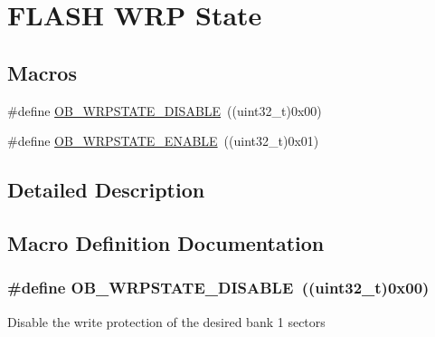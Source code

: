 \hypertarget{group___f_l_a_s_h_ex___w_r_p___state}{}\section{F\+L\+A\+SH W\+RP State}
\label{group___f_l_a_s_h_ex___w_r_p___state}
\subsection*{Macros}
\begin{DoxyCompactItemize}
\item 
\#define \hyperlink{group___f_l_a_s_h_ex___w_r_p___state_gaa34eb6205fe554f65a311ee974d5a4ab}{O\+B\+\_\+\+W\+R\+P\+S\+T\+A\+T\+E\+\_\+\+D\+I\+S\+A\+B\+LE}~((uint32\+\_\+t)0x00)
\item 
\#define \hyperlink{group___f_l_a_s_h_ex___w_r_p___state_ga9fc463145ab57616baa36d95523186a1}{O\+B\+\_\+\+W\+R\+P\+S\+T\+A\+T\+E\+\_\+\+E\+N\+A\+B\+LE}~((uint32\+\_\+t)0x01)
\end{DoxyCompactItemize}


\subsection{Detailed Description}


\subsection{Macro Definition Documentation}
\subsubsection[{\texorpdfstring{O\+B\+\_\+\+W\+R\+P\+S\+T\+A\+T\+E\+\_\+\+D\+I\+S\+A\+B\+LE}{OB_WRPSTATE_DISABLE}}]{\setlength{\rightskip}{0pt plus 5cm}\#define O\+B\+\_\+\+W\+R\+P\+S\+T\+A\+T\+E\+\_\+\+D\+I\+S\+A\+B\+LE~((uint32\+\_\+t)0x00)}\hypertarget{group___f_l_a_s_h_ex___w_r_p___state_gaa34eb6205fe554f65a311ee974d5a4ab}{}\label{group___f_l_a_s_h_ex___w_r_p___state_gaa34eb6205fe554f65a311ee974d5a4ab}
Disable the write protection of the desired bank 1 sectors 

